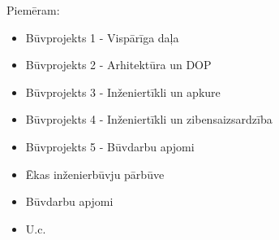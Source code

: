 Piemēram:

\begin{itemize}
	\item Būvprojekts 1 {-} Vispārīga daļa
	\item Būvprojekts 2 {-} Arhitektūra un DOP
	\item Būvprojekts 3 {-} Inženiertīkli un apkure
	\item Būvprojekts 4 {-} Inženiertīkli un zibensaizsardzība
	\item Būvprojekts 5 {-} Būvdarbu apjomi
	\item Ēkas inženierbūvju pārbūve
	\item Būvdarbu apjomi
	\item U.c.
\end{itemize}
